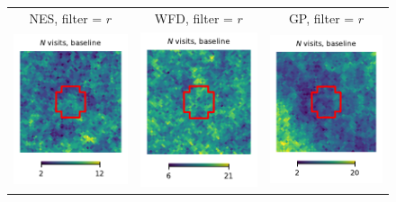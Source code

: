 \documentclass[preprintm,linenumbers]{aastex631}
\begin{document}
  
  	\begin{figure}
			\centering
			\begin{tabular}{  c c c}
                 NES, filter = $r$ & WFD, filter = $r$ & GP, filter = $r$ \\
				\includegraphics{results/skymaps_cutout/skymaps_cutout_first_year_one_snap_v4_0_10yrs_db_noDD_noTwi_nside-256_CountMetric_r_NES_noDD_noTwi.pdf} &
				\includegraphics{results/skymaps_cutout/skymaps_cutout_first_year_one_snap_v4_0_10yrs_db_noDD_noTwi_nside-256_CountMetric_r_WFD_noDD_noTwi.pdf} &
				\includegraphics{results/skymaps_cutout/skymaps_cutout_first_year_one_snap_v4_0_10yrs_db_noDD_noTwi_nside-256_CountMetric_r_GP_noDD_noTwi.pdf} \\

\end{tabular}
\end{figure}
\end{document}
